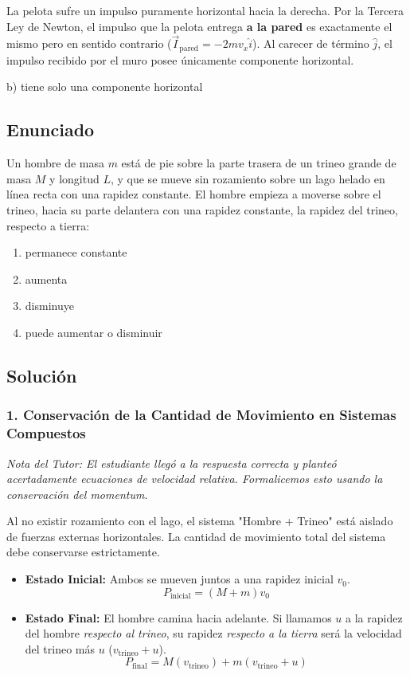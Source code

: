 \documentclass[12pt, a4paper]{article}
\begin{document}
La pelota sufre un impulso puramente horizontal hacia la derecha. Por la Tercera Ley de Newton, el impulso que la pelota entrega \textbf{a la pared} es exactamente el mismo pero en sentido contrario ($\vec{I}_{\text{pared}} = -2mv_x \hat{i}$). Al carecer de término $\hat{j}$, el impulso recibido por el muro posee únicamente componente horizontal.

\begin{tcolorbox}[colback=green!5!white, colframe=green!50!black, title=Respuesta Final]
\centering \Large b) tiene solo una componente horizontal
\end{tcolorbox}

\newpage

\subsection*{Enunciado}
Un hombre de masa $m$ está de pie sobre la parte trasera de un trineo grande de masa $M$ y longitud $L$, y que se mueve sin rozamiento sobre un lago helado en línea recta con una rapidez constante. El hombre empieza a moverse sobre el trineo, hacia su parte delantera con una rapidez constante, la rapidez del trineo, respecto a tierra:
\begin{enumerate}[label=\alph*)]
    \item permanece constante
    \item aumenta
    \item disminuye
    \item puede aumentar o disminuir
\end{enumerate}

\subsection*{Solución}

\subsubsection*{1. Conservación de la Cantidad de Movimiento en Sistemas Compuestos}
\textit{Nota del Tutor: El estudiante llegó a la respuesta correcta y planteó acertadamente ecuaciones de velocidad relativa. Formalicemos esto usando la conservación del momentum.}

Al no existir rozamiento con el lago, el sistema "Hombre + Trineo" está aislado de fuerzas externas horizontales. La cantidad de movimiento total del sistema debe conservarse estrictamente.
\begin{itemize}
    \item \textbf{Estado Inicial:} Ambos se mueven juntos a una rapidez inicial $v_0$.
    $$ P_{\text{inicial}} = (M + m)v_0 $$
    \item \textbf{Estado Final:} El hombre camina hacia adelante. Si llamamos $u$ a la rapidez del hombre \textit{respecto al trineo}, su rapidez \textit{respecto a la tierra} será la velocidad del trineo más $u$ ($v_{\text{trineo}} + u$). 
    $$ P_{\text{final}} = M(v_{\text{trineo}}) + m(v_{\text{trineo}} + u) $$
\end{itemize}
\end{document}
